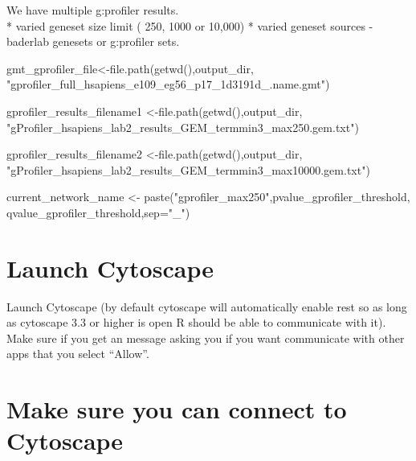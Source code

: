 \documentclass[
]{book}
\newenvironment{Shaded}{\begin{snugshade}}{\end{snugshade}}
\newcommand{\AttributeTok}[1]{\textcolor[rgb]{0.77,0.63,0.00}{#1}}
\newcommand{\FunctionTok}[1]{\textcolor[rgb]{0.00,0.00,0.00}{#1}}
\newcommand{\NormalTok}[1]{#1}
\newcommand{\OtherTok}[1]{\textcolor[rgb]{0.56,0.35,0.01}{#1}}
\newcommand{\StringTok}[1]{\textcolor[rgb]{0.31,0.60,0.02}{#1}}
\begin{document}
We have multiple g:profiler results.\\
* varied geneset size limit ( 250, 1000 or 10,000)
* varied geneset sources - baderlab genesets or g:profiler sets.

\begin{Shaded}
\begin{Highlighting}[]
\NormalTok{ gmt\_gprofiler\_file}\OtherTok{\textless{}{-}}\FunctionTok{file.path}\NormalTok{(}\FunctionTok{getwd}\NormalTok{(),output\_dir,}
                \StringTok{"gprofiler\_full\_hsapiens\_e109\_eg56\_p17\_1d3191d\_.name.gmt"}\NormalTok{)}

\NormalTok{gprofiler\_results\_filename1 }\OtherTok{\textless{}{-}}\FunctionTok{file.path}\NormalTok{(}\FunctionTok{getwd}\NormalTok{(),output\_dir,}
                \StringTok{"gProfiler\_hsapiens\_lab2\_results\_GEM\_termmin3\_max250.gem.txt"}\NormalTok{)}

\NormalTok{gprofiler\_results\_filename2 }\OtherTok{\textless{}{-}}\FunctionTok{file.path}\NormalTok{(}\FunctionTok{getwd}\NormalTok{(),output\_dir,}
                \StringTok{"gProfiler\_hsapiens\_lab2\_results\_GEM\_termmin3\_max10000.gem.txt"}\NormalTok{)}


\NormalTok{current\_network\_name }\OtherTok{\textless{}{-}} \FunctionTok{paste}\NormalTok{(}\StringTok{"gprofiler\_max250"}\NormalTok{,pvalue\_gprofiler\_threshold,}
\NormalTok{                              qvalue\_gprofiler\_threshold,}\AttributeTok{sep=}\StringTok{"\_"}\NormalTok{)}
\end{Highlighting}
\end{Shaded}

\hypertarget{launch-cytoscape}{%
\section{Launch Cytoscape}\label{launch-cytoscape}}

Launch Cytoscape (by default cytoscape will automatically enable rest so as long as cytoscape 3.3 or higher is open R should be able to communicate with it). Make sure if you get an message asking you if you want communicate with other apps that you select ``Allow''.

\hypertarget{make-sure-you-can-connect-to-cytoscape}{%
\section{Make sure you can connect to Cytoscape}\label{make-sure-you-can-connect-to-cytoscape}}
\end{document}
